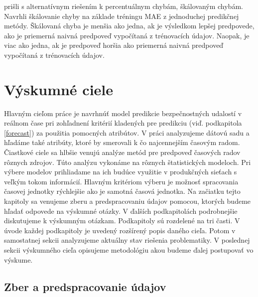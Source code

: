 \documentclass[thesismargins, thesislinespacing, openright, upjsfrontpage, combineabstracts]{rnthesis}
\begin{document}
\cite{hyndman2006another} prišli s alternatívnym riešením k percentuálnym chybám, škálovaným chybám. Navrhli škálovanie chyby na základe tréningu MAE z jednoduchej predikčnej metódy. Škálovaná chyba je menšia ako jedna, ak je výsledkom lepšej predpovede, ako je priemerná naivná predpoveď vypočítaná z trénovacích údajov. Naopak, je viac ako jedna, ak je predpoveď horšia ako priemerná naivná predpoveď vypočítaná z trénovacích údajov.



\chapter{Výskumné ciele}

Hlavným cieľom práce je navrhnúť model predikcie bezpečnostných udalostí v reálnom čase pri zohľadnení kritérií kladených pre predikciu (viď. podkapitola \ref{forecast}) za použitia pomocných atribútov. V práci analyzujeme dátovú sadu a hľadáme také atribúty, ktoré by smerovali k čo najcennejším časovým radom. Čiastkové ciele sa hlbšie venujú analýze metód pre predpoveď časových radov rôznych zdrojov. Túto analýzu vykonáme na rôznych štatistických modeloch. Pri výbere modelov prihliadame na ich budúce využitie v produkčných sieťach s veľkým tokom informácií. Hlavným kritériom výberu je možnosť spracovania časovej jednotky rýchlejšie ako je samotná časová jednotka. Na začiatku tejto kapitoly sa venujeme zberu a predspracovaniu údajov pomocou, ktorých budeme hľadať odpovede na výskumné otázky. V ďalších podkapitolách podrobnejšie diskutujeme k výskumným otázkam. Podkapitoly sú rozdelené na tri časti. V úvode každej podkapitoly je uvedený rozšírený popis daného cieľa. Potom v samostatnej sekcii analyzujeme aktuálny stav riešenia problematiky. V poslednej sekcii výskumného cieľa opisujeme metodológiu akou budeme ďalej postupovať vo výskume. 

\section{Zber a predspracovanie údajov}
\end{document}
